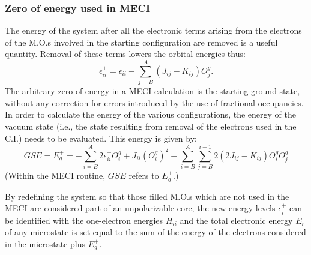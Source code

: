 \subsubsection{Zero of energy used in MECI}
The energy of the system after all the electronic terms arising from the
electrons of the M.O.s involved in the starting configuration are removed
is a useful quantity. Removal of these terms lowers the orbital
energies thus:
$$
\epsilon_{ii}^+ = \epsilon_{ii} -\sum_{j=B}^A(J_{ij}-K_{ij})O_j^g.
$$
The arbitrary zero of energy in a MECI calculation is the  starting ground
state, without any correction for errors introduced by the use of fractional
occupancies.  In order to calculate the energy of the various configurations,
the  energy  of  the  vacuum  state  (i.e.,  the  state resulting from removal
of the electrons used in the C.I.)  needs  to  be evaluated.  This energy is
given by:
$$
GSE=E_g^+ = - \sum_{i=B}^A2\epsilon_{ii}^+O_i^g+J_{ii}(O_i^g)^2+
\sum_{i=B}^A\sum_{j=B}^{i-1}2(2J_{ij}-K_{ij})O_i^gO_j^g
$$
(Within the MECI routine, $GSE$ refers to $E_g^+$.)

By redefining the system so that those filled M.O.s which are not used in the
MECI are considered part of an 
unpolarizable core, the new energy levels $\epsilon_i^+$ can be identified with
the one-electron energies $H_{ii}$ and the total electronic energy $E_r$ of any
microstate is set equal to the sum of the energy of the electrons considered in
the microstate plus $E_g^+$.

